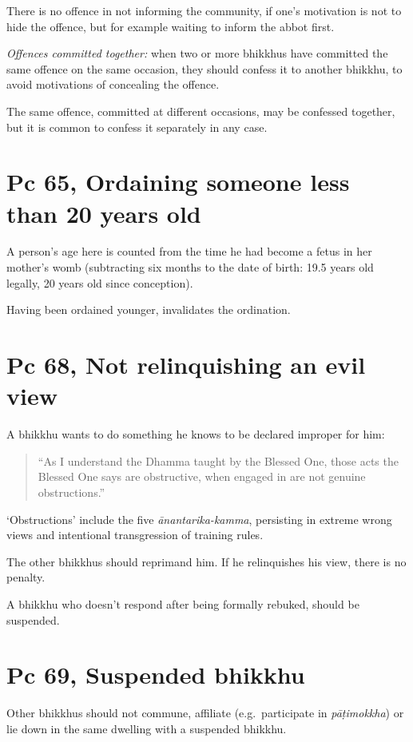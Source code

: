 There is no offence in not informing the community, if one's motivation
is not to hide the offence, but for example waiting to inform the abbot
first.

\emph{Offences committed together:} when two or more bhikkhus have
committed the same offence on the same occasion, they should confess it
to another bhikkhu, to avoid motivations of concealing the offence.

The same offence, committed at different occasions, may be confessed
together, but it is common to confess it separately in any case.

\section{Pc 65, Ordaining someone less than 20 years old}

A person's age here is counted from the time he had become a fetus in
her mother's womb (subtracting six months to the date of birth: 19.5
years old legally, 20 years old since conception).

Having been ordained younger, invalidates the ordination.

\section{Pc 68, Not relinquishing an evil view}

A bhikkhu wants to do something he knows to be declared improper for
him:

\begin{quote}
``As I understand the Dhamma taught by the Blessed One, those acts the
Blessed One says are obstructive, when engaged in are not genuine
obstructions.''
\end{quote}

`Obstructions' include the five \emph{ānantarika-kamma}, persisting in
extreme wrong views and intentional transgression of training rules.

The other bhikkhus should reprimand him. If he relinquishes his view,
there is no penalty.

A bhikkhu who doesn't respond after being formally rebuked, should be
suspended.

\section{Pc 69, Suspended bhikkhu}

Other bhikkhus should not commune, affiliate (e.g.~participate in
\emph{pāṭimokkha}) or lie down in the same dwelling with a suspended
bhikkhu.

